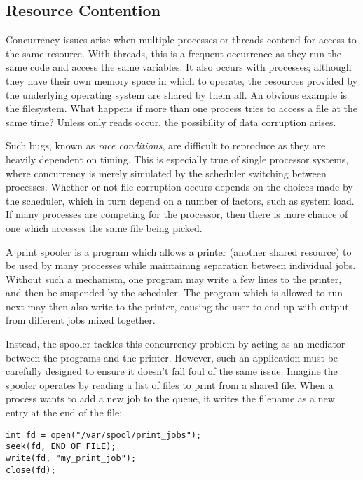 \subsection{Resource Contention}

Concurrency issues arise when multiple processes or threads contend
for access to the same resource.  With threads, this is a frequent
occurrence as they run the same code and access the same variables.
It also occurs with processes; although they have their own memory
space in which to operate, the resources provided by the underlying
operating system are shared by them all.  An obvious example is the
filesystem.  What happens if more than one process tries to access a
file at the same time?  Unless only reads occur, the possibility of
data corruption arises.

Such bugs, known as \emph{race conditions}, are difficult to reproduce
as they are heavily dependent on timing.  This is especially true of
single processor systems, where concurrency is merely simulated by the
scheduler switching between processes.  Whether or not file corruption
occurs depends on the choices made by the scheduler, which in turn
depend on a number of factors, such as system load.  If many processes
are competing for the processor, then there is more chance of one
which accesses the same file being picked.

A print spooler is a program which allows a printer (another shared
resource) to be used by many processes while maintaining separation
between individual jobs.  Without such a mechanism, one program may
write a few lines to the printer, and then be suspended by the
scheduler.  The program which is allowed to run next may then also
write to the printer, causing the user to end up with output from
different jobs mixed together.

Instead, the spooler tackles this concurrency problem by acting as an
mediator between the programs and the printer.  However, such an
application must be carefully designed to ensure it doesn't fall foul
of the same issue.  Imagine the spooler operates by reading a list of
files to print from a shared file.  When a process wants to add a new
job to the queue, it writes the filename as a new entry at the end of
the file:

\begin{verbatim}
int fd = open("/var/spool/print_jobs");
seek(fd, END_OF_FILE);
write(fd, "my_print_job");
close(fd);
\end{verbatim}

